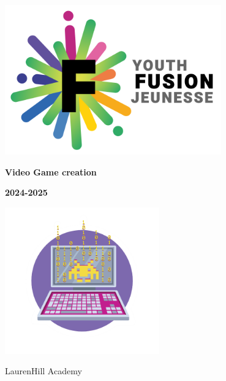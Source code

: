 \begin{titlepage}
    \centering
    
    \includegraphics[width=0.7\textwidth]{assets/fj.png}
    \vspace{2cm}
    
    {\huge\bfseries Video Game creation\par}
    \vspace{0.5cm}
    {\Large\bfseries 2024-2025\par}
    \vspace{1cm}
    
    \vfill
    
    \includegraphics[width=0.5\textwidth]{assets/jv.png}

    \vspace{1cm}
    \raggedleft
    \large LaurenHill Academy

\end{titlepage}
